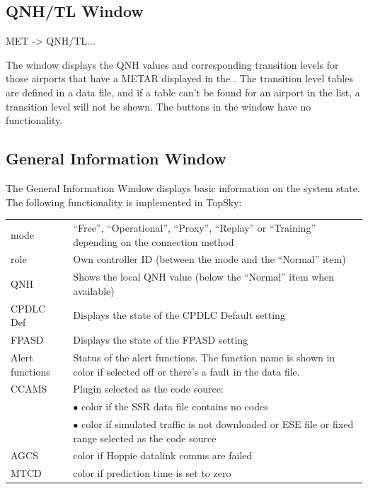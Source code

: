 \documentclass[a4paper,oneside,11pt]{memoir}
\begin{document}
\subsection{QNH/TL Window}
\label{win:qnhtl}

 MET -> QNH/TL...

\bigskip


The window displays the QNH values and corresponding transition levels for those airports that have a METAR displayed in the . The transition level tables are defined in a data file, and if a table can’t be found for an airport in the list, a transition level will not be shown. The buttons in the window have no functionality.

\subsection{General Information Window}
\label{win:geninfo}

\bigskip


The General Information Window displays basic information on the system state. The following functionality is implemented in TopSky:

\begin{longtable}{p{2.5cm} p{10cm}}
    mode                & “Free”, “Operational”, “Proxy”, “Replay” or “Training” depending on the connection method \\
    role                & Own controller ID (between the mode and the “Normal” item)\\
    QNH                 & Shows the local QNH value (below the “Normal” item when available)\\
    CPDLC Def           & Displays the state of the CPDLC Default setting\\
    FPASD               & Displays the state of the FPASD setting \\
    Alert functions     & Status of the alert functions. The function name is shown in {Warning} color if selected off or there’s a fault in the data file.\\
    CCAMS               & Plugin selected as the code source:\\
                        & $\bullet$ {Urgency} color if the SSR data file contains no codes\\
                        & $\bullet$ {Warning} color if simulated traffic is not downloaded or ESE file or fixed range selected as the code source\\
    AGCS                & {Warning} color if Hoppie datalink comms are failed\\
    MTCD                & {Warning} color if prediction time is set to zero    \\
\end{longtable}
\end{document}
